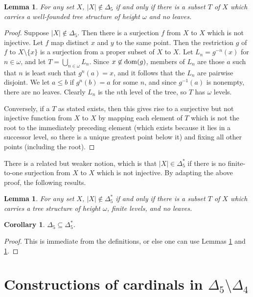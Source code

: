 \documentclass[a4paper,reqno]{amsart}
\numberwithin{equation}{section}
\newtheorem{lemma}[theorem]{Lemma}
\newtheorem{corollary}[theorem]{Corollary}
\begin{document}
\begin{lemma} For any set $X$, $|X| \not \in \Delta_5$ if and only if there is a subset $T$ of $X$ which carries a 
well-founded tree structure of height $\omega$ and no leaves. \label{2.1}  \end{lemma}

\begin{proof}  Suppose $|X| \not \in \Delta_5$. Then there is a surjection $f$ from $X$ to $X$ which is not injective. Let $f$ map
distinct $x$ and $y$ to the same point. Then the restriction $g$ of $f$ to $X \setminus \{x\}$ is a surjection from a proper
subset of $X$ to $X$. Let $L_n = g^{-n}(x)$ for $n \in \omega$, and let $T = \bigcup_{n \in \omega}L_n$. Since $x \not \in {\rm dom}(g)$,
members of $L_n$ are those $a$ such that $n$ is least such that $g^n(a) = x$, and it follows that the $L_n$ are pairwise disjoint. We
let $a \le b$ if $g^n(b) = a$ for some $n$, and since $g^{-1}(a)$ is nonempty, there are no leaves. Clearly $L_n$ is the $n$th level of
the tree, so $T$ has $\omega$ levels.

Conversely, if a $T$ as stated exists, then this gives rise to a surjective but not injective function from $X$ to $X$ by mapping each
element of $T$ which is not the root to the immediately preceding element (which exists because it lies in a successor level, so there is a 
unique greatest point below it) and fixing all other points (including the root).   \end{proof}

There is a related but weaker notion, which is that $|X| \in \Delta_5^*$ if there is no finite-to-one surjection from $X$ to $X$
which is not injective. By adapting the above proof, the following results.

\begin{lemma} For any set $X$, $|X| \not \in \Delta_5^*$ if and only if there is a subset $T$ of $X$ which carries a tree structure 
of height $\omega$, finite levels, and no leaves. \label{2.2}  \end{lemma}

\begin{corollary} $\Delta_5 \subseteq \Delta_5^*$. \label{2.3}  \end{corollary}
\begin{proof}  This is immediate from the definitions, or else one can use Lemmas \ref{2.1} and \ref{2.2}.  \end{proof}



\section{Constructions of cardinals in $\Delta_5 \setminus \Delta_4$}
\end{document}
